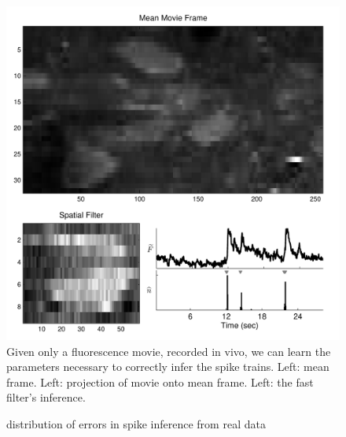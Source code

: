 
\begin{figure}[H]
\centering \includegraphics[width=.9\linewidth]{../graphics/spatial_data}
\caption{Given only a fluorescence movie, recorded in vivo, we can learn the parameters necessary to correctly infer the spike trains. Left: mean frame.  Left: projection of movie onto mean frame. Left: the fast filter's inference.} \label{fig:spatial_data}
\end{figure}

\begin{figure}[H]
\caption{distribution of errors in spike inference from real data} \label{fig:err}
\end{figure}


